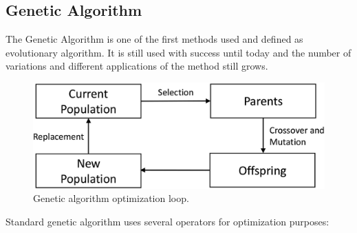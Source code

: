 \documentclass[12pt,a4paper,openany]{book}
\begin{document}
\subsection{Genetic Algorithm}


The Genetic Algorithm is one of the first methods used and defined as evolutionary algorithm. It is still used with success until today and the number of variations and different applications of the method still grows.

 \begin{figure}[ht!]
     \centering
     \includegraphics[scale=0.22]{figs/gen-algo.eps}
     \caption{Genetic algorithm optimization loop.}\label{Fig:genalgo1}
 \end{figure}


\noindent Standard genetic algorithm uses several operators for optimization purposes:




\end{document}

